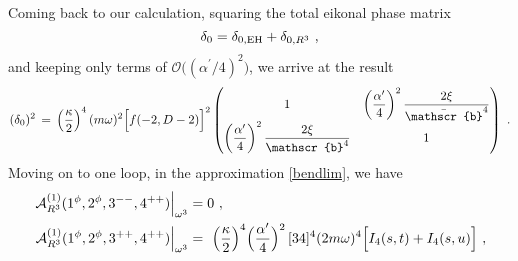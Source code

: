 \documentclass[a4paper,11pt]{article}
\numberwithin{equation}{section}
\begin{document}
%
Coming back to our calculation,  squaring the total eikonal phase matrix
\begin{equation}
\label{leadingtreetotal}
    \delta_0 = \delta_{0, {\rm EH}} + \delta_{0, R^3}\ , 
\end{equation}
and keeping only terms  of $\mathcal{O} \big( (\alpha^\prime / 4)^2 \big)$, we arrive at  the result
\begin{align}
(\mathcal{\delta}_0 )^2\, =  \, \left({\kappa\over 2}\right)^4 ( m \omega)^2 \Big[ f (-2, D-2)\Big]^2
\begin{pmatrix}1& \left(\dfrac{\alpha^\prime}{4}\right)^2  \dfrac{2 \xi}{\bar{\mathscr{b}}^4}\\
\left(\dfrac{\alpha^\prime}{4}\right)^2  \dfrac{2 \xi}{{\mathscr{b}}^4} & 1 
 \end{pmatrix}
 \ .
\end{align}
%
Moving on to one loop, 
in the approximation \eqref{bendlim}, we have
\begin{align}
\begin{split} 
\left.\mathcal{A}_{R^3}^{(1)} (1^\phi, 2^\phi, 3^{--}, 4^{++})\right|_{\omega^3}& = 0
\ , \\
\left.\mathcal{A}_{R^3}^{(1)} (1^\phi, 2^\phi, 3^{++}, 4^{++})\right|_{\omega^3}&  = \  \Big({  \kappa\over 2} \Big)^4 \Big({  \alpha^\prime \over 4} \Big)^2 \,  [34]^4 (2 m \omega )^4 \Big[ I_4(s, t) + I_4 (s, u)\Big] \ ,
\end{split} 
\end{align}
\end{document}
